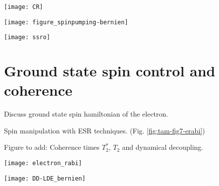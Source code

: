 \begin{figure*}
	\centering
	\texttt{[image: CR]}
	\caption{\label{fig:tam-fig4-cr} \textbf{Verifying the charge state and laser resonances} (a) Schematic of the experimental sequence to verify the charge state of the NV center and the laser resonances. The process is controlled by an ADwin microprocessor which turns on the two red lasers and compares the number of photons detected by the avalanche photodiode (APD) to a predetermined threshold (verify stage). When the number of detected photons is below the threshold a green laser is applied to prepare the $NV^-$ state (repump stage), otherwise the experimental sequence is initiated. (b) Photon number distribution during the verification stage, conditioned on the previous CR check being successful. }
\end{figure*}


\begin{figure*}
	\centering
	\texttt{[image: figure\_spinpumping-bernien]}
	\caption{\label{fig:tam-fig5-SP} Figure from \cite{Bernien__2014} \textbf{Initilization by spin pumping} (a) }
\end{figure*}

\begin{figure*}
	\centering
	\texttt{[image: ssro]}
	\caption{\label{fig:tam-fig6-ssro} \textbf{Single shot readout} (a) }
\end{figure*}

\section{Ground state spin control and coherence}

Discuss ground state spin hamiltonian of the electron.

Spin manipulation with ESR techniques. (Fig. \ref{fig:tam-fig7-erabi})

Figure to add: Coherence times $T_2^{*}$, $T_2$ and dynamical decoupling.

\label{sec:groundstatecontrol}
\begin{figure*}
	\centering
	\texttt{[image: electron\_rabi]}
	\caption{\label{fig:tam-fig7-erabi} \textbf{} (a) }
\end{figure*}


\begin{figure*}
	\centering
	\texttt{[image: DD-LDE\_bernien]}
	\caption{\label{fig:tam-fig9-DD} \textbf{Dynamical Decoupling of the electron spin} (a) }
\end{figure*}


